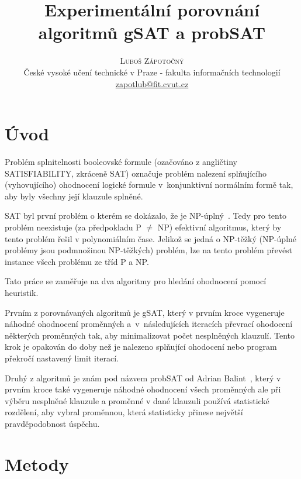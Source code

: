 \documentclass[twoside,twocolumn]{article}
\title{Experimentální porovnání algoritmů gSAT a probSAT} %
\author{%
    \textsc{Luboš Zápotočný}\\[1ex] %
    \normalsize České vysoké učení technické v Praze - fakulta informačních technologií \\ %
    \normalsize \href{mailto:zapotlub@fit.cvut.cz}{zapotlub@fit.cvut.cz} %
}
\date{} %
\begin{document}
    \maketitle



    \section{Úvod}

    Problém splnitelnosti booleovské formule (ozačováno z angličtiny SATISFIABILITY, zkráceně SAT) označuje problém
    nalezení splňujícího (vyhovujícího) ohodnocení logické formule v~konjunktivní normálním formě tak, aby byly všechny její
    klauzule splněné.

    SAT byl první problém o kterém se dokázalo, že je NP-úplný~\cite{CookLevin1971}.
    Tedy pro tento problém neexistuje (za předpokladu P $\neq$ NP) efektivní algoritmus, který by tento problém řešil v polynomiálním čase.
    Jelikož se jedná o NP-těžký (NP-úplné problémy jsou podmnožinou NP-těžkých) problém, lze na tento problém převést instance všech problému ze tříd P a NP.

    Tato práce se zaměřuje na dva algoritmy pro hledání ohodnocení pomocí heuristik.

    Prvním z porovnávaných algoritmů je gSAT, který v prvním kroce vygeneruje náhodné ohodnocení proměnných a~v~následujících
    iteracích převrací ohodocení některých proměnných tak, aby minimalizovat počet nesplněných klauzulí.
    Tento krok je opakován do doby než je nalezeno splňující ohodocení nebo program překročí nastavený limit iterací.

    Druhý z algoritmů je znám pod názvem probSAT od Adrian Balint~\cite{probSAT}, který v prvním kroce také vygeneruje náhodné
    ohodnocení všech proměnných ale při výběru nesplněné klauzule a proměnné v dané klauzuli používá statistické rozdělení, aby
    vybral proměnnou, která statisticky přinese největší pravděpodobnost úspěchu.



    \section{Metody}
\end{document}
